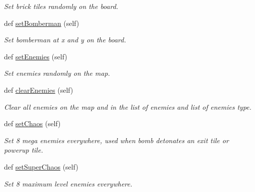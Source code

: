 \begin{DoxyCompactItemize}
\begin{DoxyCompactList}\small\item\em Set brick tiles randomly on the board. \end{DoxyCompactList}\item 
\hypertarget{classsrc_1_1level_1_1_level_a76cfaab350e8f7699f054e9e9423de6c}{}def \hyperlink{classsrc_1_1level_1_1_level_a76cfaab350e8f7699f054e9e9423de6c}{set\+Bomberman} (self)\label{classsrc_1_1level_1_1_level_a76cfaab350e8f7699f054e9e9423de6c}

\begin{DoxyCompactList}\small\item\em Set bomberman at x and y on the board. \end{DoxyCompactList}\item 
\hypertarget{classsrc_1_1level_1_1_level_af60d85055b9f07935312e581b5316364}{}def \hyperlink{classsrc_1_1level_1_1_level_af60d85055b9f07935312e581b5316364}{set\+Enemies} (self)\label{classsrc_1_1level_1_1_level_af60d85055b9f07935312e581b5316364}

\begin{DoxyCompactList}\small\item\em Set enemies randomly on the map. \end{DoxyCompactList}\item 
\hypertarget{classsrc_1_1level_1_1_level_acd226ddc877d5bf1e18c4d2a7e790fb3}{}def \hyperlink{classsrc_1_1level_1_1_level_acd226ddc877d5bf1e18c4d2a7e790fb3}{clear\+Enemies} (self)\label{classsrc_1_1level_1_1_level_acd226ddc877d5bf1e18c4d2a7e790fb3}

\begin{DoxyCompactList}\small\item\em Clear all enemies on the map and in the list of enemies and list of enemies type. \end{DoxyCompactList}\item 
\hypertarget{classsrc_1_1level_1_1_level_a4b318116c4f5b2bdad46be495e21c53d}{}def \hyperlink{classsrc_1_1level_1_1_level_a4b318116c4f5b2bdad46be495e21c53d}{set\+Chaos} (self)\label{classsrc_1_1level_1_1_level_a4b318116c4f5b2bdad46be495e21c53d}

\begin{DoxyCompactList}\small\item\em Set 8 mega enemies everywhere, used when bomb detonates an exit tile or powerup tile. \end{DoxyCompactList}\item 
\hypertarget{classsrc_1_1level_1_1_level_acf03686c3657b7e1a5436bbf1b721bf2}{}def \hyperlink{classsrc_1_1level_1_1_level_acf03686c3657b7e1a5436bbf1b721bf2}{set\+Super\+Chaos} (self)\label{classsrc_1_1level_1_1_level_acf03686c3657b7e1a5436bbf1b721bf2}

\begin{DoxyCompactList}\small\item\em Set 8 maximum level enemies everywhere. \end{DoxyCompactList}\end{DoxyCompactItemize}
